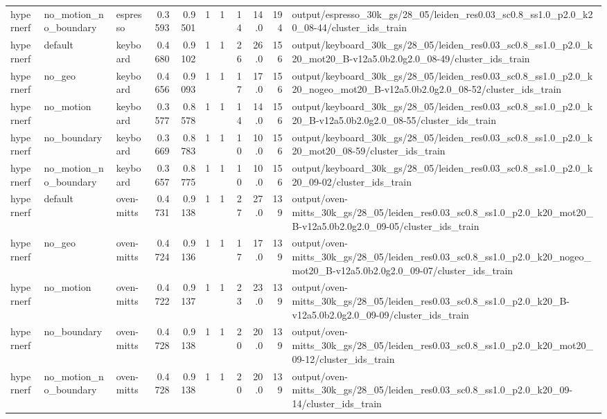 \documentclass[10pt]{article}
\begin{document}
\begin{longtable}{lllrrrrrrrp{8cm}}
hypernerf & no\_motion\_no\_boundary & espresso & 0.3593 & 0.9501 & 1 & 1 & 14 & 14.0 & 194 & output/espresso\_30k\_gs/28\_05/leiden\_res0.03\_sc0.8\_ss1.0\_p2.0\_k20\_08-44/cluster\_ids\_train \\
hypernerf & default & keyboard & 0.4680 & 0.9102 & 1 & 1 & 26 & 26.0 & 156 & output/keyboard\_30k\_gs/28\_05/leiden\_res0.03\_sc0.8\_ss1.0\_p2.0\_k20\_mot20\_B-v12a5.0b2.0g2.0\_08-49/cluster\_ids\_train \\
hypernerf & no\_geo & keyboard & 0.4656 & 0.9093 & 1 & 1 & 17 & 17.0 & 156 & output/keyboard\_30k\_gs/28\_05/leiden\_res0.03\_sc0.8\_ss1.0\_p2.0\_k20\_nogeo\_mot20\_B-v12a5.0b2.0g2.0\_08-52/cluster\_ids\_train \\
hypernerf & no\_motion & keyboard & 0.3577 & 0.8578 & 1 & 1 & 14 & 14.0 & 156 & output/keyboard\_30k\_gs/28\_05/leiden\_res0.03\_sc0.8\_ss1.0\_p2.0\_k20\_B-v12a5.0b2.0g2.0\_08-55/cluster\_ids\_train \\
hypernerf & no\_boundary & keyboard & 0.3669 & 0.8783 & 1 & 1 & 10 & 10.0 & 156 & output/keyboard\_30k\_gs/28\_05/leiden\_res0.03\_sc0.8\_ss1.0\_p2.0\_k20\_mot20\_08-59/cluster\_ids\_train \\
hypernerf & no\_motion\_no\_boundary & keyboard & 0.3657 & 0.8775 & 1 & 1 & 10 & 10.0 & 156 & output/keyboard\_30k\_gs/28\_05/leiden\_res0.03\_sc0.8\_ss1.0\_p2.0\_k20\_09-02/cluster\_ids\_train \\
hypernerf & default & oven-mitts & 0.4731 & 0.9138 & 1 & 1 & 27 & 27.0 & 139 & output/oven-mitts\_30k\_gs/28\_05/leiden\_res0.03\_sc0.8\_ss1.0\_p2.0\_k20\_mot20\_B-v12a5.0b2.0g2.0\_09-05/cluster\_ids\_train \\
hypernerf & no\_geo & oven-mitts & 0.4724 & 0.9136 & 1 & 1 & 17 & 17.0 & 139 & output/oven-mitts\_30k\_gs/28\_05/leiden\_res0.03\_sc0.8\_ss1.0\_p2.0\_k20\_nogeo\_mot20\_B-v12a5.0b2.0g2.0\_09-07/cluster\_ids\_train \\
hypernerf & no\_motion & oven-mitts & 0.4722 & 0.9137 & 1 & 1 & 23 & 23.0 & 139 & output/oven-mitts\_30k\_gs/28\_05/leiden\_res0.03\_sc0.8\_ss1.0\_p2.0\_k20\_B-v12a5.0b2.0g2.0\_09-09/cluster\_ids\_train \\
hypernerf & no\_boundary & oven-mitts & 0.4728 & 0.9138 & 1 & 1 & 20 & 20.0 & 139 & output/oven-mitts\_30k\_gs/28\_05/leiden\_res0.03\_sc0.8\_ss1.0\_p2.0\_k20\_mot20\_09-12/cluster\_ids\_train \\
hypernerf & no\_motion\_no\_boundary & oven-mitts & 0.4728 & 0.9138 & 1 & 1 & 20 & 20.0 & 139 & output/oven-mitts\_30k\_gs/28\_05/leiden\_res0.03\_sc0.8\_ss1.0\_p2.0\_k20\_09-14/cluster\_ids\_train \\

\end{longtable}
\end{document}
